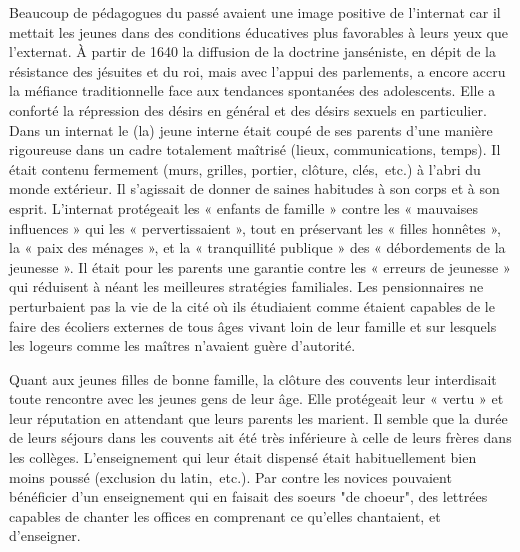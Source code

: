 Beaucoup de pédagogues du passé avaient une image positive de l'internat car il mettait les jeunes dans des conditions éducatives plus favorables à leurs yeux que l'externat. À partir de 1640 la diffusion de la doctrine janséniste, en dépit de la résistance des jésuites et du roi, mais avec l'appui des parlements, a encore accru la méfiance traditionnelle face aux tendances spontanées des adolescents. Elle a conforté la répression des désirs en général et des désirs sexuels en particulier. Dans un internat le (la) jeune interne était coupé de ses parents d'une manière rigoureuse dans un cadre totalement maîtrisé (lieux, communications, temps). Il était contenu fermement (murs, grilles, portier, clôture, clés,~etc.) à l'abri du monde extérieur. Il s'agissait de donner de saines habitudes à son corps et à son esprit.  L'internat protégeait les « enfants de famille » contre les « mauvaises influences » qui les « pervertissaient », tout en préservant les « filles honnêtes », la « paix des ménages », et la « tranquillité publique » des « débordements de la jeunesse ». Il était pour les parents une garantie contre les « erreurs de jeunesse » qui réduisent à néant les meilleures stratégies familiales. Les pensionnaires ne perturbaient pas la vie de la cité où ils étudiaient comme étaient capables de le faire des écoliers externes de tous âges vivant loin de leur famille et sur lesquels les logeurs comme les maîtres n'avaient guère d'autorité. 

Quant aux jeunes filles de bonne famille, la clôture des couvents leur interdisait toute rencontre avec les jeunes gens de leur âge. Elle protégeait leur « vertu » et leur réputation en attendant que leurs parents les marient. Il semble que la durée de leurs séjours dans les couvents ait été très inférieure à celle de leurs frères dans les collèges. L'enseignement qui leur était dispensé était habituellement bien moins poussé (exclusion du latin,~etc.). Par contre les novices pouvaient bénéficier d'un enseignement qui en faisait des soeurs "de choeur", des lettrées capables de chanter les offices en comprenant ce qu'elles chantaient, et d'enseigner.

